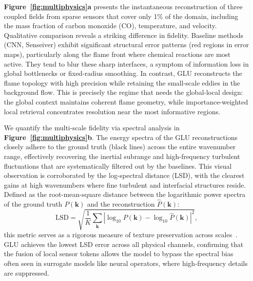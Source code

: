 \documentclass[pdflatex,sn-nature]{sn-jnl}%
\begin{document}
\textbf{Figure~\ref{fig:multiphysics}a} presents the instantaneous reconstruction of three coupled fields from sparse sensors that cover only 1\% of the domain, including the mass fraction of carbon monoxide (CO), temperature, and velocity. 
Qualitative comparison reveals a striking difference in fidelity. 
Baseline methods (CNN, Senseiver) exhibit significant structural error patterns (red regions in error maps), particularly along the flame front where chemical reactions are most active. 
They tend to blur these sharp interfaces, a symptom of information loss in global bottlenecks or fixed-radius smoothing. 
In contrast, GLU reconstructs the flame topology with high precision while retaining the small-scale eddies in the background flow. 
This is precisely the regime that needs the global-local design: the global context maintains coherent flame geometry, while importance-weighted local retrieval concentrates resolution near the most informative regions.

We quantify the multi-scale fidelity via spectral analysis in \textbf{Figure~\ref{fig:multiphysics}b}. The energy spectra of the GLU reconstructions closely adhere to the ground truth (black lines) across the entire wavenumber range, effectively recovering the inertial subrange and high-frequency turbulent fluctuations that are systematically filtered out by the baselines. 
This visual observation is corroborated by the log-spectral distance (LSD), with the clearest gains at high wavenumbers where fine turbulent and interfacial structures reside. 
Defined as the root-mean-square distance between the logarithmic power spectra of the ground truth $P(\mathbf{k})$ and the reconstruction $\hat{P}(\mathbf{k})$:
\begin{equation}
\text{LSD} = \sqrt{ \frac{1}{K} \sum_{\mathbf{k}} \left| \log_{10} P(\mathbf{k}) - \log_{10} \hat{P}(\mathbf{k}) \right|^2 },
\end{equation}
this metric serves as a rigorous measure of texture preservation across scales~\cite{iotti2025rainscalegan}. 
GLU achieves the lowest LSD error across all physical channels, confirming that the fusion of local sensor tokens allows the model to bypass the spectral bias often seen in surrogate models like neural operators, where high-frequency details are suppressed.
\end{document}
